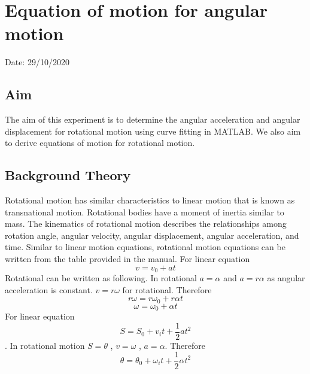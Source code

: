 \chapter{Equation of motion for angular motion}

Date: 29/10/2020

\section{Aim}
The aim of this experiment is to determine the angular acceleration and angular displacement for rotational motion using curve fitting in MATLAB. We also aim to derive equations of motion for rotational motion.


\section{Background Theory}

Rotational motion has similar characteristics to linear motion that is known as transnational motion. Rotational bodies have a moment of inertia similar to mass. The kinematics of rotational motion describes the relationships among rotation angle, angular velocity, angular displacement, angular acceleration, and time. Similar to linear motion equations, rotational motion equations can be written from the table provided in the manual. 
For linear equation $$ v=v_0 +at$$ Rotational can be written as following. In rotational $a = \alpha$ and $ a= r \alpha$ as angular acceleration is constant. $v=r \omega$ for rotational. Therefore 
$$ r \omega = r \omega_0 + r\alpha t $$ 
$$ \omega=\omega_0 + \alpha t$$
For linear equation $$ S= S_0 + v_i t + \frac{1}{2} a t^2$$. In rotational motion $S=\theta$ , $v=\omega$ , $a=\alpha$. Therefore 
$$\theta = \theta_0 + \omega_i t + \frac{1}{2} \alpha t^2 $$






